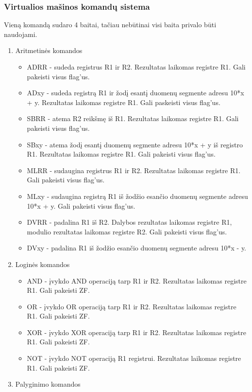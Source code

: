 	\subsubsection{Virtualios mašinos komandų sistema}
	Vieną komandą sudaro 4 baitai, tačiau nebūtinai visi baita privalo būti naudojami.
	\begin{enumerate}
	\item Aritmetinės komandos
		\begin{itemize}
		\item ADRR - sudeda registrus R1 ir R2. Rezultatas laikomas registre R1. Gali pakeisti visus flag'us.
		\item ADxy - sudeda registrą R1 ir žodį esantį duomenų segmente adresu 10*x + y. Rezultatas laikomas registre R1. Gali paskeisti visus flag'us.
		\item SBRR - atema R2 reikšmę iš R1. Rezultatas laikomas registre R1. Gali pakeisti visus flag'us.
		\item SBxy - atema žodį esantį duomenų segmente adresu 10*x + y iš registro R1. Rezultatas laikomas registre R1. Gali pakeisti visus flag'us.
		\item MLRR - sudaugina registrus R1 ir R2. Rezultatas laikomas registre R1. Gali pakeisti visus flag'us.
		\item MLxy - sudaugina registrą R1 iš žodžio esančio duomenų segmente adresu 10*x + y. Gali pakeisti visus flag'us.
		\item DVRR - padalina R1 iš R2. Dalybos rezultatas laikomas registre R1, modulio rezultatas laikomas registre R2. Gali pakeisti visus flag'us.
		\item DVxy - padalina R1 iš žodžio esančio duomenų segmente adresu 10*x - y.
		\end{itemize}
	\item Loginės komandos
		\begin{itemize}
		\item AND - įvykdo AND operaciją tarp R1 ir R2. Rezultatas laikomas registre R1. Gali pakeisti ZF.
		\item OR - įvykdo OR operaciją tarp R1 ir R2. Rezultatas laikomas registre R1. Gali pakeisti ZF.
		\item XOR - įvykdo XOR operaciją tarp R1 ir R2. Rezultatas laikomas registre R1. Gali pakeisti ZF.
		\item NOT - įvykdo NOT operaciją R1 registrui. Rezultatas laikomas registre R1. Gali pakeisti ZF.
		\end{itemize}
	\item Palyginimo komandos

\end{enumerate}
